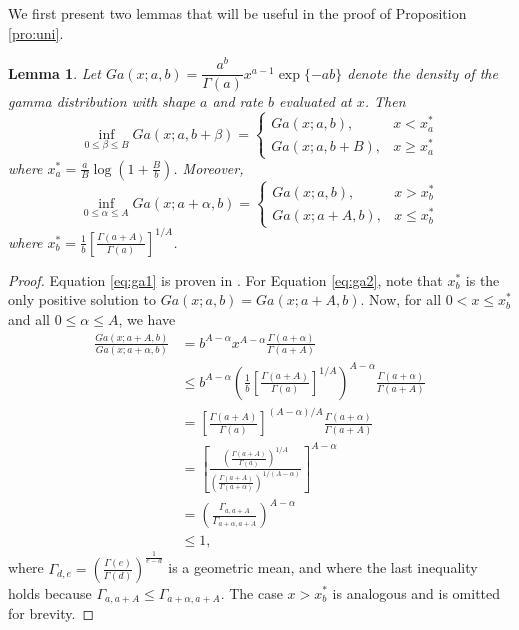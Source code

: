 \documentclass[11pt]{article}
\newtheorem{lemma}{Lemma}[section]
\begin{document}
	We first present two lemmas that will be useful in the proof of Proposition \ref{pro:uni}.
	\begin{lemma}
		\label{pro:ga1}
		Let $Ga(x;a,b) = \dfrac{a^b}{\Gamma(a)}x^{a-1}\exp\{-ab\}$ denote the density of the gamma distribution with shape $a$ and rate $b$ evaluated at $x$. Then
		\begin{equation}
			\label{eq:ga1}
			\inf_{0\le \beta\le B} Ga(x;a,b+\beta) = 
			\begin{cases}
				Ga(x;a,b), & x<x_a^* \\ Ga(x;a,b+B), & x\ge x_a^*
			\end{cases}
		\end{equation}	
		where $x_a^*=\frac{a}{B}\log\left( 1+\frac{B}{b}\right) $. Moreover,
		\begin{equation}
			\label{eq:ga2}
			\inf_{0\le \alpha\le A} Ga(x;a+\alpha,b) = 
			\begin{cases}
				Ga(x;a,b), & x>x_b^* \\ Ga(x;a+A,b), & x\le x_b^*
			\end{cases}
		\end{equation}
		where $x_b^*=\frac{1}{b}\left[ \frac{\Gamma(a+A)}{\Gamma(a)}\right]^{1/A}$. 
	\end{lemma}
	\begin{proof}
		Equation \eqref{eq:ga1} is proven in \cite{Jones.2004}. For Equation \eqref{eq:ga2}, note that $x_b^*$ is the only positive solution to $Ga(x;a,b) = Ga(x;a+A,b)$. Now, for all $0<x\le x_b^*$ and all $0\le\alpha\le A$, we have
		\begin{align*}
			\frac{Ga(x;a+A,b)}{Ga(x;a+\alpha,b)}
			& = b^{A-\alpha}x^{A-\alpha} \frac{\Gamma(a+\alpha)}{\Gamma(a+A)} \\
			& \le b^{A-\alpha}\left(\frac{1}{b}\left[ \frac{\Gamma(a+A)}{\Gamma(a)}\right]^{1/A} \right)^{A-\alpha} \frac{\Gamma(a+\alpha)}{\Gamma(a+A)} \\
			& = \left[ \frac{\Gamma(a+A)}{\Gamma(a)}\right]^{(A-\alpha)/A} \frac{\Gamma(a+\alpha)}{\Gamma(a+A)} \\
			& = \left[
			\frac{\left(\frac{\Gamma(a+A)}{\Gamma(a)}\right)^{1/A}}{\left(\frac{\Gamma(a+A)}{\Gamma(a+\alpha)}\right)^{1/(A-\alpha)}}
			\right]^{A-\alpha} \\
			& = \left( \frac{\Gamma_{a,a+A}}{\Gamma_{a+\alpha, a+A}}\right)^{A-\alpha} \\
			& \le 1,
		\end{align*}
		where $\Gamma_{d,e} = \left( \frac{\Gamma(e)}{\Gamma(d)} \right)^{\frac{1}{e-d}}$ is a geometric mean,
		and where the last inequality holds because $\Gamma_{a,a+A}\le\Gamma_{a+\alpha, a+A}$.
		The case $x>x_b^*$ is analogous and is omitted for brevity.
	\end{proof}
	
\end{document}
